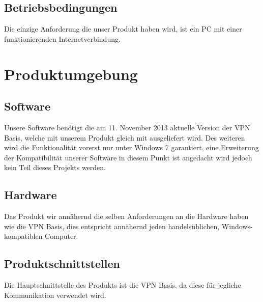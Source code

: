 \documentclass[a4paper,12pt]{scrreprt}
\begin{document}
	
		
		
	\section{Betriebsbedingungen}
	Die einzige Anforderung die unser Produkt haben wird, ist ein PC mit einer funktionierenden Internetverbindung. 	
		
\chapter{Produktumgebung}
	
	\section{Software}
		
		Unsere Software benötigt die am 11. November 2013 aktuelle Version der VPN Basis, welche mit unserem Produkt gleich mit ausgeliefert wird. Des weiteren wird die Funktionalität vorerst nur unter Windows 7 garantiert, eine Erweiterung der Kompatibilität unserer Software in diesem Punkt ist angedacht wird jedoch kein Teil dieses Projekts werden.
		
	\section{Hardware}
		
		Das Produkt wir annähernd die selben Anforderungen an die Hardware haben wie die VPN Basis, dies entspricht annähernd jeden handelsüblichen, Windows-kompatiblen Computer.	
		
	\section{Produktschnittstellen}
		
		Die Hauptschnittstelle des Produkts ist die VPN Basis, da diese für jegliche Kommunikation verwendet wird. 
		
\end{document}
